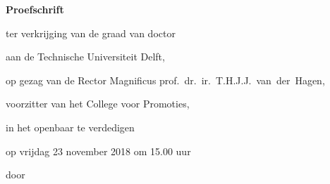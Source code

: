 \begin{titlepage}

\begin{center}

\vspace*{2\bigskipamount}

{\makeatletter
\titlestyle\bfseries\LARGE\@title
\makeatother}

{\makeatletter
\ifx\@subtitle\undefined\else
    \bigskip
    \titlefont\titleshape\Large\@subtitle
\fi
\makeatother}

\end{center}

\cleardoublepage
\thispagestyle{empty}

\begin{center}


\vspace*{2\bigskipamount}

{\makeatletter
\titlestyle\bfseries\LARGE\@title
\makeatother}

{\makeatletter
\ifx\@subtitle\undefined\else
    \bigskip
    \titlefont\titleshape\Large\@subtitle
\fi
\makeatother}

\vfill


{\Large\titlefont\bfseries Proefschrift}

\bigskip
\bigskip

ter verkrijging van de graad van doctor

aan de Technische Universiteit Delft,

op gezag van de Rector Magnificus prof.~dr.~ir.~T.H.J.J.~van~der~Hagen,

voorzitter van het College voor Promoties,

in het openbaar te verdedigen

op vrijdag 23 november 2018 om 15.00 uur

\bigskip
\bigskip

door

\bigskip
\bigskip

\makeatletter
{\Large\titlefont\bfseries\@firstname\ \titleshape{\MakeUppercase{\@lastname}}}
\makeatother


\end{center}
\end{titlepage}
